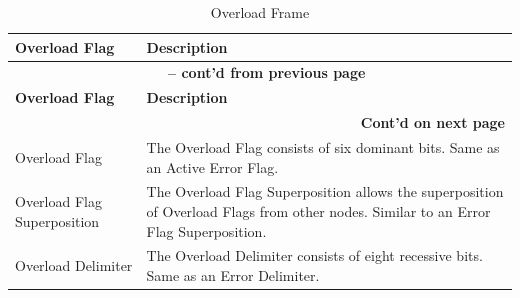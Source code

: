 \begin{longtable}[c]{|p{4.5cm}|p{12cm}|} 
    
  \caption{Overload Frame}
  \label{tab:twai-overload-frame} 
  \\\hline
  \rowcolor{lightgray}
  \textbf{Overload Flag} & \textbf{Description}
  \\\hline
  \endfirsthead
  
  \multicolumn{2}{c}{\bfseries \tablename\ \thetable{} -- cont'd from previous page}\\  \hline
  
  \rowcolor{lightgray}
    \textbf{Overload Flag} & \textbf{Description}
  \\\hline
  \endhead
  
  \multicolumn{2}{r}{\textbf{Cont'd on next page}} \\
  \endfoot
  \endlastfoot
  
    Overload Flag & The Overload Flag consists of six dominant bits. Same as an Active Error Flag.
          \\\hline
    Overload Flag Superposition & The Overload Flag Superposition allows the superposition of Overload Flags from other nodes. Similar to an Error Flag Superposition.
           \\\hline
    Overload Delimiter & The Overload Delimiter consists of eight recessive bits. Same as an Error Delimiter.              \\\hline
\end{longtable}
